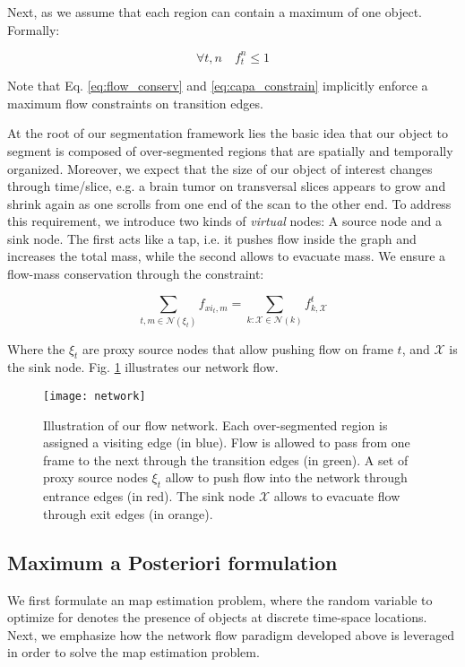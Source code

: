 Next, as we assume that each region can contain a maximum of one object. Formally:

\begin{equation}
  \label{eq:capa_constrain}
  \forall t,n \quad f_{t}^{n} \leq 1
\end{equation}

Note that Eq. \ref{eq:flow_conserv} and \ref{eq:capa_constrain} implicitly enforce a maximum flow constraints on transition edges.

At the root of our segmentation framework lies the basic idea that our object to segment is composed of over-segmented regions that are spatially and temporally organized.
Moreover, we expect that the size of our object of interest changes through time/slice, e.g. a brain tumor on transversal slices appears to grow and shrink again as one scrolls from one end of the scan to the other end.
To address this requirement, we introduce two kinds of \textit{virtual} nodes: A source node and a sink node.
The first acts like a tap, i.e. it pushes flow inside the graph and increases the total mass, while the second allows to evacuate mass.
We ensure a flow-mass conservation through the constraint:

\begin{equation}
  \label{eq:mass_constrain}
  \sum_{t,m\in \mathcal{N}(\xi_{t})}f_{xi_{t},m} = \sum_{k:\mathcal{X}\in\mathcal{N}(k)}f^{t}_{k,\mathcal{X}}
\end{equation}

Where the $\xi_{t}$ are proxy source nodes that allow pushing flow on frame $t$, and $\mathcal{X}$ is the sink node.
Fig. \ref{fig:flownetwork} illustrates our network flow.

\begin{figure}[!htpb]
  \centering
  \texttt{[image: network]}
  \caption{Illustration of our flow network. Each over-segmented region is assigned a visiting edge (in blue).
    Flow is allowed to pass from one frame to the next through the transition edges (in green).
    A set of proxy source nodes $\xi_{t}$ allow to push flow into the network through entrance edges (in red).
  The sink node $\mathcal{X}$ allows to evacuate flow through exit edges (in orange).}
  \label{fig:flownetwork}
\end{figure}

\subsection{Maximum a Posteriori formulation}
We first formulate an \gls{map} estimation problem, where the random variable to optimize for denotes the presence of objects at discrete time-space locations.
Next, we emphasize how the network flow paradigm developed above is leveraged in order to solve the \gls{map} estimation problem.

